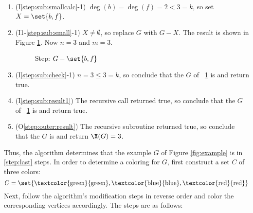 \begin{enumerate}
\item (I\ref{step:sub:smallcalc}-1) \(\deg(b)=\deg(f)=2<3=k\), so set \(X=\set{b,f}\).

\item (I1-\ref{step:sub:small}-1) \(X\ne\emptyset\), so replace \(G\) with \(G-X\).  The result is shown in Figure
  \ref{fig:removecf}.  Now \(n=3\) and \(m=3\).

  \begin{figure}[H]
    \centering
    \caption{Step: \(G-\set{b,f}\)}
    \label{fig:removecf}
  \end{figure}

\item (I\ref{step:sub:check}-1) \(n=3\le3=k\), so conclude that the \(G\) of \figurename~\ref{fig:removecf} is
   and return true.

\item (I\ref{step:sub:result1}) The recursive call returned true, so conclude that the \(G\) of
  \figurename~\ref{fig:removecf} is  and return true.

\item (O\ref{step:outer:result})\label{step:last} The recursive subroutine returned true, so conclude that the \(G\)
  is  and return \(\X(G)=3\).
\end{enumerate}

Thus, the algorithm determines that the example \(G\) of Figure \ref{fig:example} is  in
\ref{step:last} steps.  In order to determine a  coloring for \(G\), first construct a set \(C\) of
three colors:
\[C=\set{\text{\textcolor{green}{green}},\text{\textcolor{blue}{blue}},\text{\textcolor{red}{red}}}\]
Next, follow the algorithm's modification steps in reverse order and color the corresponding vertices accordingly.
The steps are as follows:

